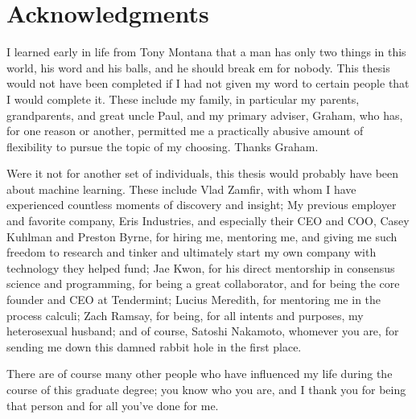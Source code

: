 \chapter*{Acknowledgments}
I learned early in life from Tony Montana that a man has only two things in this world, his word and his balls, and he should break em for nobody.
This thesis would not have been completed if I had not given my word to certain people that I would complete it.
These include my family, in particular my parents, grandparents, and great uncle Paul, and my primary adviser, Graham,
who has, for one reason or another, permitted me a practically abusive amount of flexibility to pursue the topic of my choosing.
Thanks Graham.

Were it not for another set of individuals, this thesis would probably have been about machine learning.
These include Vlad Zamfir, with whom I have experienced countless moments of discovery and insight;
My previous employer and favorite company, Eris Industries, and especially their CEO and COO, Casey Kuhlman and Preston Byrne,
for hiring me, mentoring me, and giving me such freedom to research and tinker and ultimately start my own company with technology they helped fund;
Jae Kwon, for his direct mentorship in consensus science and programming, for being a great collaborator, and for being the core founder and CEO at Tendermint;
Lucius Meredith, for mentoring me in the process calculi;
Zach Ramsay, for being, for all intents and purposes, my heterosexual husband;
and of course, Satoshi Nakamoto, whomever you are, for sending me down this damned rabbit hole in the first place.

There are of course many other people who have influenced my life during the course of this graduate degree;
you know who you are, and I thank you for being that person and for all you've done for me.

\tableofcontents
\listoffigures
\listoftables
{}

